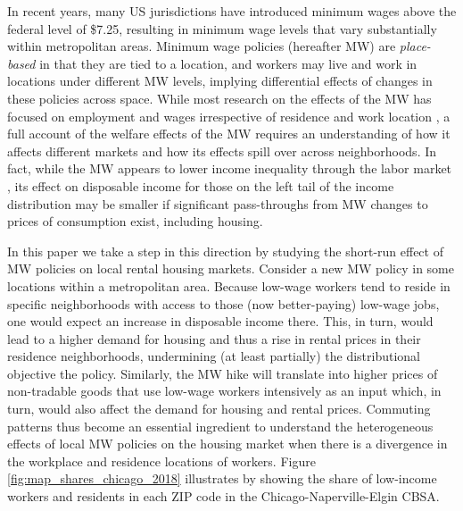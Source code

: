 

In recent years, many US jurisdictions have introduced minimum wages above the 
federal level of \$7.25, resulting in minimum wage levels that vary 
substantially within metropolitan areas.
Minimum wage policies (hereafter MW) are \textit{place-based} in that they are 
tied to a location, and workers may live and work in locations under different 
MW levels, 
implying differential effects of changes in these policies across space.
While most research on the effects of the MW has focused on employment and 
wages irrespective of residence and work location
\parencite[e.g.,][]{CardKrueger1994, CegnizEtAl2019},
a full account of the welfare effects of the MW requires an understanding of 
how it affects different markets and how its effects spill over across 
neighborhoods.
In fact, while the MW appears to lower income inequality through the labor 
market \parencite{Lee1999, AutorEtAl2016},
its effect on disposable income for those on the left tail of the income 
distribution may be smaller if significant pass-throughs from MW changes to 
prices of consumption exist, including housing.

In this paper we take a step in this direction by studying the short-run effect 
of MW policies on local rental housing markets.
Consider a new MW policy in some locations within a metropolitan area.
Because low-wage workers tend to reside in specific neighborhoods with access 
to those (now better-paying) low-wage jobs,
one would expect an increase in disposable income there.
This, in turn, would lead to a higher demand for housing and thus 
a rise in rental prices in their residence neighborhoods,
undermining (at least partially) the distributional objective the policy.
Similarly, the MW hike will translate into higher prices of non-tradable goods 
that use low-wage workers intensively as an input which, in turn, 
would also affect the demand for housing and rental prices.
Commuting patterns thus become an essential ingredient to understand the 
heterogeneous effects of local MW policies on the housing market when there 
is a divergence in the workplace and residence locations of workers.
Figure \ref{fig:map_shares_chicago_2018} illustrates by showing the share 
of low-income workers and residents in each ZIP code in the 
Chicago-Naperville-Elgin CBSA.

